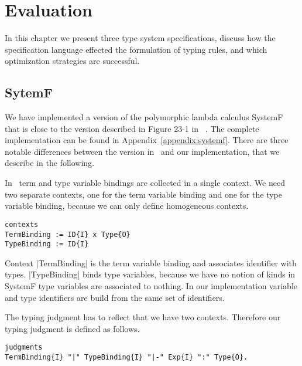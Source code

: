 \chapter{Evaluation}
\label{cha:evaluation}
In this chapter we present three type system specifications, discuss
how the specification language effected the formulation of typing
rules, and which optimization strategies are successful.
\section{SytemF}
\label{sec:sytemf}
We have implemented a version of the polymorphic lambda calculus
SystemF that is close to the version described in Figure 23-1 in
~\cite{Pierce:2002:TPL:509043}. The complete implementation can be
found in Appendix~\ref{appendix:systemf}. There are three notable
differences between the version in~\cite{Pierce:2002:TPL:509043} and
our implementation, that we describe in the following.

In~\cite{Pierce:2002:TPL:509043} term and type variable bindings are
collected in a single context. We need two separate contexts, one for
the term variable binding and one for the type variable binding,
because we can only define homogeneous contexts.

\begin{lstlisting}[language=sltc]
contexts
TermBinding := ID{I} x Type{O}
TypeBinding := ID{I}
\end{lstlisting}

Context \code|TermBinding| is the term variable binding and associates
identifier with types. \code|TypeBinding| binds type variables,
because we have no notion of kinds in SystemF type variables are
associated to nothing. In our implementation variable and type
identifiers are build from the same set of identifiers.

The typing judgment has to reflect that we have two
contexts. Therefore our typing judgment is defined as follows.

\begin{lstlisting}[language=sltc]
judgments
TermBinding{I} "|" TypeBinding{I} "|-" Exp{I} ":" Type{O}.
\end{lstlisting}

